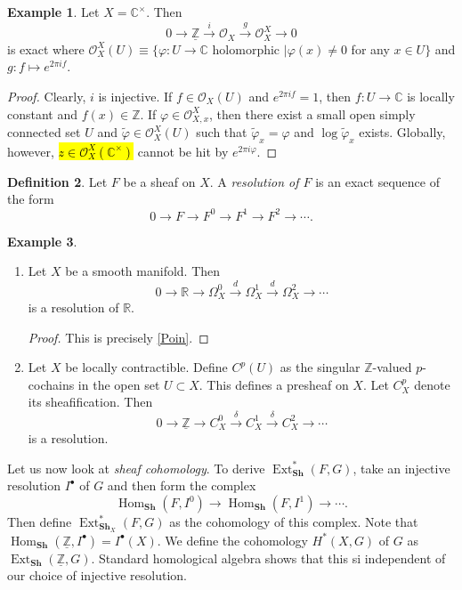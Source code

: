 \documentclass[10pt,letterpaper,cm]{nupset}
\theoremstyle{definition}
\newtheorem{definition}{Definition}[subsection]
\newtheorem{exmp}[definition]{Example}
\theoremstyle{theorem}
\theoremstyle{remark}
\newcommand{\C}{\mathbb C}
\newcommand{\R}{\mathbb{R}}
\newcommand{\Z}{\mathbb Z}
\newcommand{\1}{\mathbb{1}}
\newcommand{\0}{\vec 0}
\DeclareMathOperator{\ext}{Ext}
\DeclareMathOperator{\Hom}{Hom}
\begin{document}
\begin{exmp}
 Let $X = \C^{\times}$. Then $$ 0 \to \underline{\Z} \overset{i}{\longrightarrow} \mathcal{O}_X \overset{g}{\longrightarrow} \mathcal{O}_X^X \to 0$$ is exact where $\mathcal{O}_X^X(U) \equiv \{ \varphi : U \to \C$ holomorphic $\mid \varphi(x) \ne 0$ for any $x\in U\}$ and $g : f \mapsto e^{2\pi i f}$.
\end{exmp}
\begin{proof}
Clearly, $i$ is injective. If $f \in \mathcal{O}_X(U)$ and $e^{2\pi i f} =1$, then $f : U \to \C$ is locally constant and $f(x) \in \Z$. If $\varphi \in \mathcal{O}_{X,x}^X$, then there exist a small open simply connected set $U$ and $\tilde{\varphi} \in \mathcal{O}_X^X(U)$ such that $\tilde{\varphi}_x = \varphi$ and $\log{\tilde{\varphi}_x}$ exists. Globally, however, \hl{$z\in \mathcal{O}_X^X(\C^{\times})$} cannot be hit by $e^{2\pi i \varphi}$.
\end{proof}

\begin{definition}
Let $F$ be a sheaf on $X$. A \textit{resolution of $F$} is an exact sequence of the form $$0 \to F \to F^0 \to F^1 \to F^2 \to \cdots .$$
\end{definition}

\begin{exmp} $ $
\begin{enumerate}
\item Let $X$ be a smooth manifold. Then $$0 \to \R \to \Omega_X^0 \overset{d}{\longrightarrow} \Omega_X^1 \overset{d}{\longrightarrow} \Omega^2_X \to \cdots$$ is a resolution of $\R$.
\begin{proof}
This is precisely \cref{Poin}.
\end{proof}
\item Let $X$ be locally contractible. Define $C^p(U)$ as the singular $\Z$-valued $p$-cochains in the open set $U\subset X$. This defines a presheaf on $X$. Let $C^p_X$ denote its sheafification. Then $$0 \to \underline{\Z} \to C^0_X \overset{\delta}{\longrightarrow} C^1_X \overset{\delta}{\longrightarrow} C^2_X \to \cdots$$ is a resolution. 
\end{enumerate}
\end{exmp}

\medskip

Let us now look at \textit{sheaf cohomology}.
 To derive $\ext^{\ast}_{\mathbf{Sh}}(F, G)$, take an injective resolution $I^{\bullet}$ of $G$ and then form the complex $$\Hom_{\mathbf{Sh}}(F, I^0) \to \Hom_{\mathbf{Sh}}(F, I^1) \to \cdots.$$ Then define $\ext^{\ast}_{\mathbf{Sh}_{X}}(F, G)$ as the cohomology of this complex. Note that $\Hom_{\mathbf{Sh}}(\underline{\Z}, I^{\bullet}) = I^{\bullet}(X)$. We define the cohomology $H^{\ast}(X, G)$ of $G$ as $\ext_{\mathbf{Sh}}(\underline{\Z}, G)$.  Standard homological algebra shows that this si independent of our choice of injective resolution.  
\end{document}
